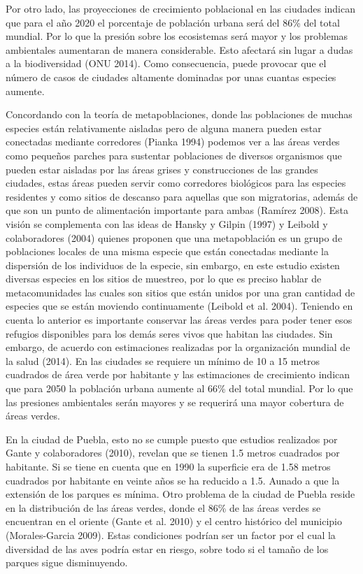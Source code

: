 \documentclass[letterpaper,12pt]{article}
\begin{document}
Por otro lado, las proyecciones de crecimiento poblacional en  las ciudades indican que para el año 2020 el porcentaje de población urbana será del 86\% del total mundial. Por lo que la presión sobre los ecosistemas será mayor y los problemas ambientales aumentaran de manera considerable. Esto afectará sin lugar a dudas a la biodiversidad (ONU 2014). Como consecuencia, puede provocar que el número de casos de ciudades altamente dominadas por unas cuantas especies aumente.

Concordando con la teoría de metapoblaciones, donde las poblaciones de muchas especies están relativamente
aisladas pero de alguna manera pueden estar conectadas mediante corredores (Pianka 1994) podemos ver a las áreas verdes como pequeños parches para sustentar poblaciones de diversos organismos que pueden estar aisladas por las áreas grises y construcciones de las grandes ciudades, estas áreas pueden servir como corredores biológicos para las especies residentes y como sitios de descanso para aquellas que son migratorias, además de que son un punto de alimentación importante para ambas (Ramírez 2008).
Esta visión se complementa con las ideas de Hansky y Gilpin (1997) y Leibold y colaboradores (2004) quienes proponen que una metapoblación es un grupo de poblaciones locales de una misma especie que están conectadas mediante la dispersión de los individuos de la especie, sin embargo, en este estudio existen diversas especies en los sitios de muestreo, por lo que es preciso hablar de metacomunidades las cuales son sitios que están unidos por una gran cantidad de especies que se están moviendo continuamente (Leibold et al. 2004). 
Teniendo en cuenta lo anterior es importante conservar las áreas verdes para poder tener esos refugios disponibles para los demás seres vivos que habitan las ciudades. Sin embargo, de acuerdo con estimaciones realizadas por la organización mundial de la salud (2014). En las ciudades se requiere un mínimo de 10 a 15 metros cuadrados de área verde por habitante y las estimaciones de crecimiento indican que para  2050 la población urbana aumente al 66\% del total mundial. Por lo que las presiones ambientales serán mayores y se requerirá una mayor cobertura de áreas verdes.

En la ciudad de Puebla, esto no se cumple puesto que estudios realizados por Gante y colaboradores (2010), revelan que se tienen 1.5 metros cuadrados por habitante. Si se tiene en cuenta que en 1990 la superficie era de 1.58 metros cuadrados  por habitante en veinte años se ha reducido a 1.5. 
Aunado a que la extensión de los parques es mínima. Otro problema de la ciudad de Puebla reside en la distribución de las áreas verdes, donde el 86\% de las áreas verdes se encuentran en el oriente  (Gante et al.  2010) y el centro histórico del municipio (Morales-Garcia  2009).
Estas condiciones podrían ser un factor por el cual la diversidad de las aves podría estar en riesgo, sobre todo si el tamaño de los parques sigue  disminuyendo.
\end{document}

